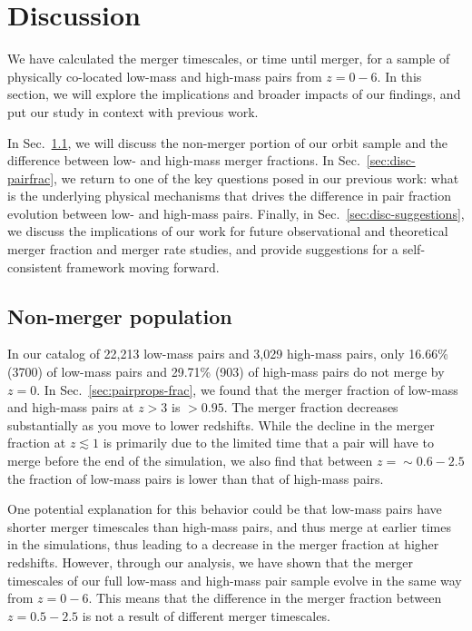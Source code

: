 \documentclass[twocolumn,linenumbers]{aastex631}
\begin{document}
\section{Discussion} \label{sec:discussion}
    We have calculated the merger timescales, or time until merger, for a sample of physically co-located low-mass and high-mass pairs from $z=0-6$.
    In this section, we will explore the implications and broader impacts of our findings, and put our study in context with previous work. 

    In Sec.~\ref{sec:disc-nonmergers}, we will discuss the non-merger portion of our orbit sample and the difference between low- and high-mass merger fractions.
    In Sec.~\ref{sec:disc-pairfrac}, we return to one of the key questions posed in our previous work: what is the underlying physical mechanisms that drives the difference in pair fraction evolution between low- and high-mass pairs. 
    Finally, in Sec.~\ref{sec:disc-suggestions}, we discuss the implications of our work for future observational and theoretical merger fraction and merger rate studies, and provide suggestions for a self-consistent framework moving forward.

    \subsection{Non-merger population}\label{sec:disc-nonmergers}
        In our catalog of 22,213 low-mass pairs and 3,029 high-mass pairs, only 16.66\% (3700) of low-mass pairs and 29.71\% (903) of high-mass pairs do not merge by $z=0$.
        In Sec.~\ref{sec:pairprops-frac}, we found that the merger fraction of low-mass and high-mass pairs at $z>3$ is $>0.95$. 
        The merger fraction decreases substantially as you move to lower redshifts. 
        While the decline in the merger fraction at $z\lesssim1$ is primarily due to the limited time that a pair will have to merge before the end of the simulation, we also find that between $z=\sim0.6-2.5$ the fraction of low-mass pairs is lower than that of high-mass pairs. 
        
        One potential explanation for this behavior could be that low-mass pairs have shorter merger timescales than high-mass pairs, and thus merge at earlier times in the simulations, thus leading to a decrease in the merger fraction at higher redshifts. 
        However, through our analysis, we have shown that the merger timescales of our full low-mass and high-mass pair sample evolve in the same way from $z=0-6$. 
        This means that the difference in the merger fraction between $z=0.5-2.5$ is not a result of different merger timescales.
    
\end{document}
